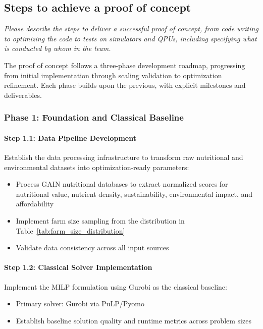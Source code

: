 \documentclass{oqireport}
\begin{document}
\subsection{Steps to achieve a proof of concept}

\textit{
Please describe the steps to deliver a successful proof of concept, from code writing to optimizing the code to tests on simulators and QPUs, including specifying what is conducted by whom in the team.
}

The proof of concept follows a three-phase development roadmap, progressing from initial implementation through scaling validation to optimization refinement. Each phase builds upon the previous, with explicit milestones and deliverables.

\subsubsection{Phase 1: Foundation and Classical Baseline}

\paragraph{Step 1.1: Data Pipeline Development}
Establish the data processing infrastructure to transform raw nutritional and environmental datasets into optimization-ready parameters:
\begin{itemize}
    \item Process GAIN nutritional databases to extract normalized scores for nutritional value, nutrient density, sustainability, environmental impact, and affordability
    \item Implement farm size sampling from the distribution in Table~\ref{tab:farm_size_distribution}
    \item Validate data consistency across all input sources
\end{itemize}

\paragraph{Step 1.2: Classical Solver Implementation}
Implement the MILP formulation using Gurobi as the classical baseline:
\begin{itemize}
    \item Primary solver: Gurobi via PuLP/Pyomo
    \item Establish baseline solution quality and runtime metrics across problem sizes
\end{itemize}
\end{document}
